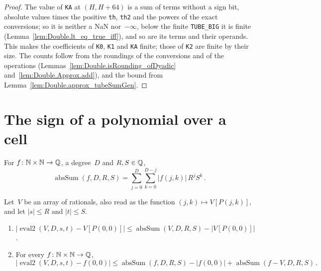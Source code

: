 \begin{proof}
  \leanok
  The value of \texttt{KA} at $(H, H + 64)$ is a sum of terms without a sign bit, absolute values
  times the positive \texttt{th}, \texttt{th2} and the powers of the exact conversions; so it is
  neither a NaN nor~$-\infty$, below the finite \texttt{TUBE\_BIG} it is finite
  (Lemma~\ref{lem:Double.lt_eq_true_iff}), and so are its terms and their operands. This makes the
  coefficients of \texttt{K0}, \texttt{K1} and \texttt{KA} finite; those of \texttt{K2} are finite
  by their size. The counts follow from the roundings of the conversions and of the operations
  (Lemmas~\ref{lem:Double.isRounding_ofDyadic} and~\ref{lem:Double.Approx.add}), and the bound
  from Lemma~\ref{lem:Double.approx_tubeSumGen}.
\end{proof}

\section{The sign of a polynomial over a cell}\label{sec:tubeSign}

\begin{definition}\label{def:absSum}
  \leanok
  For $f \colon \mathbb{N} \times \mathbb{N} \to \mathbb{Q}$, a degree~$D$ and $R, S \in \mathbb{Q}$,
  \[
    \operatorname{absSum}(f, D, R, S) = \sum_{j=0}^{D} \sum_{k=0}^{D-j} |f(j, k)|\, R^j S^k\,.
  \]
\end{definition}

\begin{lemma}\label{lem:abs_eval2_sub_le_absSum}
  \leanok
  Let~$V$ be an array of rationals, also read as the function $(j, k) \mapsto V[P(j, k)]$, and let
  $|s| \le R$ and $|t| \le S$.
  \begin{enumerate}
    \item $|\operatorname{eval2}(V, D, s, t) - V[P(0, 0)]|
      \le \operatorname{absSum}(V, D, R, S) - |V[P(0, 0)]|$.
    \item For every $f \colon \mathbb{N} \times \mathbb{N} \to \mathbb{Q}$,
      \[
        |\operatorname{eval2}(V, D, s, t) - f(0, 0)|
          \le \operatorname{absSum}(f, D, R, S) - |f(0, 0)|
            + \operatorname{absSum}(f - V, D, R, S)\,.
      \]
  \end{enumerate}
\end{lemma}

